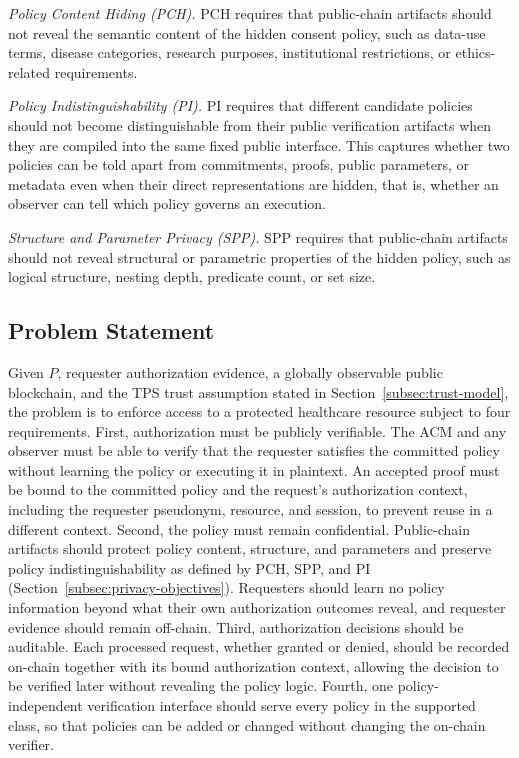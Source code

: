 \textit{Policy Content Hiding (PCH).}
PCH requires that public-chain artifacts should not reveal the semantic content of the hidden consent policy, such as data-use terms, disease categories, research purposes, institutional restrictions, or ethics-related requirements.

\textit{Policy Indistinguishability (PI).}
PI requires that different candidate policies should not become distinguishable from their public verification artifacts when they are compiled into the same fixed public interface.
This captures whether two policies can be told apart from commitments, proofs, public
parameters, or metadata even when their direct representations are hidden, that is,
whether an observer can tell which policy governs an execution.

\textit{Structure and Parameter Privacy (SPP).}
SPP requires that public-chain artifacts should not reveal structural or parametric properties of the
hidden policy, such as logical structure, nesting depth, predicate count, or set size.

\subsection{Problem Statement}

Given $P$, requester authorization evidence, a globally observable public blockchain, and the TPS trust assumption stated in Section~\ref{subsec:trust-model}, the problem is to enforce access to a protected healthcare resource subject to four requirements.
First, authorization must be publicly verifiable.
The ACM and any observer must be able to verify that the requester satisfies the committed policy without learning the policy or executing it in plaintext.
An accepted proof must be bound to the committed policy and the request's authorization context, including the requester pseudonym, resource, and session, to prevent reuse in a different context.
Second, the policy must remain confidential.
Public-chain artifacts should protect policy content, structure, and parameters and preserve policy indistinguishability as defined by PCH, SPP, and PI (Section~\ref{subsec:privacy-objectives}).
Requesters should learn no policy information beyond what their own authorization outcomes reveal, and requester evidence should remain off-chain.
Third, authorization decisions should be auditable.
Each processed request, whether granted or denied, should be recorded on-chain together with its bound authorization context, allowing the decision to be verified later without revealing the policy logic.
Fourth, one policy-independent verification interface should serve every policy in the supported class, so that policies can be added or changed without changing the on-chain verifier.
